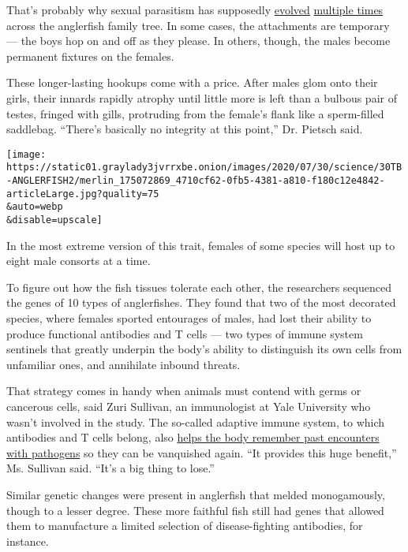 That's probably why sexual parasitism has supposedly
\href{https://pubmed.ncbi.nlm.nih.gov/20178642/}{evolved}
\href{https://bioone.org/journals/copeia/volume-2007/issue-1/0045-8511(2007)7\%5b1\%3aPRODAO\%5d2.0.CO\%3b2/Phylogenetic-Relationships-of-Deep-sea-Anglerfishes-of-the-Suborder-Ceratioidei/10.1643/0045-8511(2007)7\%5B1:PRODAO\%5D2.0.CO;2.short}{multiple
times} across the anglerfish family tree. In some cases, the attachments
are temporary --- the boys hop on and off as they please. In others,
though, the males become permanent fixtures on the females.

These longer-lasting hookups come with a price. After males glom onto
their girls, their innards rapidly atrophy until little more is left
than a bulbous pair of testes, fringed with gills, protruding from the
female's flank like a sperm-filled saddlebag. ``There's basically no
integrity at this point,'' Dr. Pietsch said.

\texttt{[image: https://static01.graylady3jvrrxbe.onion/images/2020/07/30/science/30TB-ANGLERFISH2/merlin\_175072869\_4710cf62-0fb5-4381-a810-f180c12e4842-articleLarge.jpg?quality=75\\\&auto=webp\\\&disable=upscale]}

In the most extreme version of this trait, females of some species will
host up to eight male consorts at a time.

To figure out how the fish tissues tolerate each other, the researchers
sequenced the genes of 10 types of anglerfishes. They found that two of
the most decorated species, where females sported entourages of males,
had lost their ability to produce functional antibodies and T cells ---
two types of immune system sentinels that greatly underpin the body's
ability to distinguish its own cells from unfamiliar ones, and
annihilate inbound threats.

That strategy comes in handy when animals must contend with germs or
cancerous cells, said Zuri Sullivan, an immunologist at Yale University
who wasn't involved in the study. The so-called adaptive immune system,
to which antibodies and T cells belong, also
\href{https://www.nytimes3xbfgragh.onion/2019/10/31/health/measles-vaccine-immune-system.html}{helps
the body remember past encounters with pathogens} so they can be
vanquished again. ``It provides this huge benefit,'' Ms. Sullivan said.
``It's a big thing to lose.''

Similar genetic changes were present in anglerfish that melded
monogamously, though to a lesser degree. These more faithful fish still
had genes that allowed them to manufacture a limited selection of
disease-fighting antibodies, for instance.


